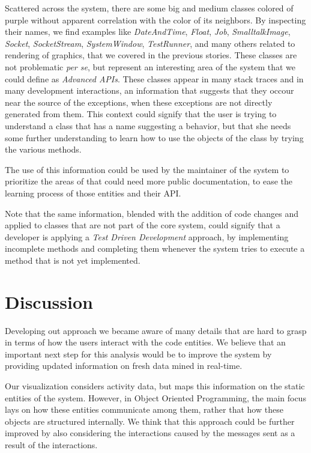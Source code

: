  Scattered across the system, there are some big and medium classes colored of purple without apparent correlation with the color of its neighbors.
By inspecting their names, we find examples like \textit{DateAndTime}, \textit{Float}, \textit{Job}, \textit{SmalltalkImage}, \textit{Socket}, \textit{SocketStream},  \textit{SystemWindow}, \textit{TestRunner}, and many others related to rendering of graphics, that we covered in the previous stories.
These classes are not problematic \emph{per se}, but represent an interesting area of the system that we could define as \emph{Advanced APIs}.
These classes appear in many stack traces and in many development interactions, an information that suggests that they occour near the source of the exceptions, when these exceptions are not directly generated from them.
This context could signify that the user is trying to understand a class that has a name suggesting a behavior, but that she needs some further understanding to learn how to use the objects of the class by trying the various methods.

The use of this information could be used by the maintainer of the system to prioritize the areas of that could need more public documentation, to ease the learning process of those entities and their API.

Note that the same information, blended with the addition of code changes and applied to classes that are not part of the core system, could signify that a developer is applying a \textit{Test Driven Development} approach, by implementing incomplete methods and completing them whenever the system tries to execute a method that is not yet implemented.


\section{Discussion}\label{sec:blend-discussion}

Developing out approach we became aware of many details that are hard to grasp in terms of how the users interact with the code entities.
We believe that an important next step for this analysis would be to improve the system by providing updated information on fresh data mined in real-time.

Our visualization considers activity data, but maps this information on the static entities of the system.
However, in Object Oriented Programming, the main focus lays on how these entities communicate among them, rather that how these objects are structured internally.
We think that this approach could be further improved by also considering the interactions caused by the messages sent as a result of the interactions.

